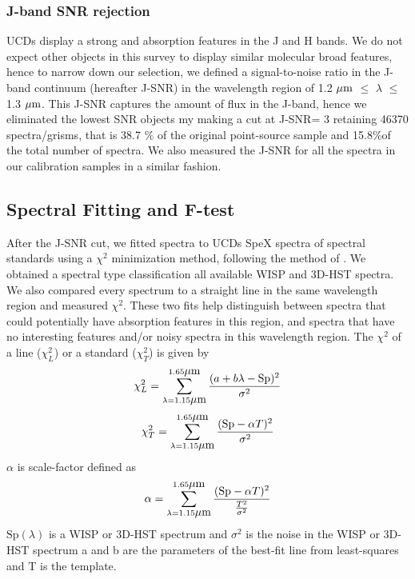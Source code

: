 \documentclass[manuscript]{aastex63}
\begin{document}
\subsubsection{J-band SNR rejection }
UCDs display a strong \wat and \meth absorption features in the J and H bands. We do not expect other objects in this survey to display similar molecular broad features, hence to narrow down our selection, we defined a signal-to-noise ratio in the J-band continuum (hereafter J-SNR) in the wavelength region of 1.2 $\mbox{$\mu$m}$ $\leq$ $\lambda$ $\leq$1.3 $\mbox{$\mu$m}$. This J-SNR captures the amount of flux in the J-band, hence we eliminated the lowest SNR objects my making a cut at J-SNR= 3 retaining 46370 spectra/grisms, that is 38.7 \% of the original point-source sample and 15.8\%of the total number of spectra. We also measured the J-SNR for all the spectra in our calibration samples in a similar fashion.

\subsection{Spectral Fitting and F-test}
After the J-SNR cut, we fitted spectra to UCDs SpeX spectra of spectral standards using a $\chi^2$ minimization method, following the method of \cite{2010ApJS..190..100K}. We obtained a spectral type classification all available WISP and 3D-HST spectra. We also compared every spectrum to a straight line in the same wavelength region and measured $\chi^2$.  These two fits help distinguish between spectra that could potentially have absorption features in this region, and spectra that have no interesting features  and/or noisy spectra in this wavelength region. The  $\chi^2 $ of a line ($\chi^2 _L $) or a standard ($\chi^2 _T $) is given by 
\begin{equation}
\chi^2 _L  = \sum _{\lambda = 1.15 \micron} ^{ 1.65 \micron} \frac{(a + b \lambda-\text{Sp} )^2}{ \sigma ^2 }
\end{equation}  
\begin{equation}
\chi^2_T= \sum _{\lambda = 1.15 \micron} ^{ 1.65 \micron} \frac{(\text{Sp}  - \alpha T)^2}{ \sigma ^2 }
\end{equation} 
$\alpha$ is scale-factor defined as 
\begin{equation}\alpha= \sum _{\lambda = 1.15 \micron} ^{ 1.65 \micron} \frac{(\text{Sp} - \alpha T)^2}{\frac{T^2}{\sigma ^2 }} 
\end{equation} $\text{Sp}  (\lambda)$ is a WISP or 3D-HST spectrum and $\sigma ^2 $ is the noise in the WISP or 3D-HST spectrum a and b are the parameters of the best-fit line from least-squares and  T is the template.
\end{document}
